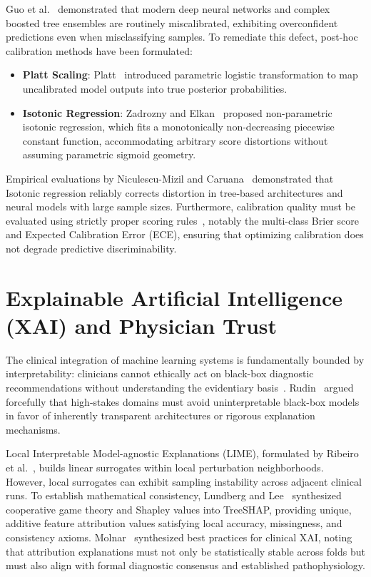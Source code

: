 Guo et al.~\cite{guo2017calibration} demonstrated that modern deep neural networks and complex boosted tree ensembles are routinely miscalibrated, exhibiting overconfident predictions even when misclassifying samples. To remediate this defect, post-hoc calibration methods have been formulated:
\begin{itemize}
    \item \textbf{Platt Scaling}: Platt~\cite{platt1999probabilistic} introduced parametric logistic transformation to map uncalibrated model outputs into true posterior probabilities.
    \item \textbf{Isotonic Regression}: Zadrozny and Elkan~\cite{zadrozny2002transforming} proposed non-parametric isotonic regression, which fits a monotonically non-decreasing piecewise constant function, accommodating arbitrary score distortions without assuming parametric sigmoid geometry.
\end{itemize}

Empirical evaluations by Niculescu-Mizil and Caruana~\cite{niculescumizil2005predicting} demonstrated that Isotonic regression reliably corrects distortion in tree-based architectures and neural models with large sample sizes. Furthermore, calibration quality must be evaluated using strictly proper scoring rules~\cite{gneiting2007strictly}, notably the multi-class Brier score~\cite{brier1950verification} and Expected Calibration Error (ECE), ensuring that optimizing calibration does not degrade predictive discriminability.

\section{Explainable Artificial Intelligence (XAI) and Physician Trust}
\label{sec:xai_lit}

The clinical integration of machine learning systems is fundamentally bounded by interpretability: clinicians cannot ethically act on black-box diagnostic recommendations without understanding the evidentiary basis~\cite{topol2019high, holzinger2019causability}. Rudin~\cite{rudin2019stop} argued forcefully that high-stakes domains must avoid uninterpretable black-box models in favor of inherently transparent architectures or rigorous explanation mechanisms.

Local Interpretable Model-agnostic Explanations (LIME), formulated by Ribeiro et al.~\cite{ribeiro2016why}, builds linear surrogates within local perturbation neighborhoods. However, local surrogates can exhibit sampling instability across adjacent clinical runs. To establish mathematical consistency, Lundberg and Lee~\cite{lundberg2017unified} synthesized cooperative game theory and Shapley values into TreeSHAP, providing unique, additive feature attribution values satisfying local accuracy, missingness, and consistency axioms. Molnar~\cite{molnar2020interpretable} synthesized best practices for clinical XAI, noting that attribution explanations must not only be statistically stable across folds but must also align with formal diagnostic consensus and established pathophysiology.


